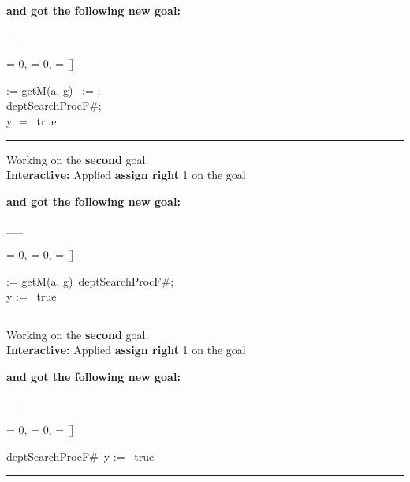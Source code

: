 \documentclass[a4paper]{article}
\begin{document}
{\bf and got the following new goal:}

\_\hrulefill \_

\begin{flushleft}
 = 0, 
 = 0, 
 = []


\Fol

\Do {} := getM(a, g)\Dc\ \Do {} := ; \\ 
 deptSearchProcF\#; \\ 
 y := \Dc\ true

\end{flushleft}



\rule{1\textwidth}{1ex}


Working on the {\bf second} goal.\\
{\bf Interactive:} Applied {\bf assign right} 1 on the goal 

{\bf and got the following new goal:}

\_\hrulefill \_

\begin{flushleft}
 = 0, 
 = 0, 
 = []


\Fol

\Do {} := getM(a, g)\Dc\ \Do deptSearchProcF\#; \\ 
 y := \Dc\ true

\end{flushleft}



\rule{1\textwidth}{1ex}


Working on the {\bf second} goal.\\
{\bf Interactive:} Applied {\bf assign right} 1 on the goal 

{\bf and got the following new goal:}

\_\hrulefill \_

\begin{flushleft}
 = 0, 
 = 0, 
 = []


\Fol

\Do deptSearchProcF\#\Dc\ \Do y := \Dc\ true

\end{flushleft}



\rule{1\textwidth}{1ex}
\end{document}
